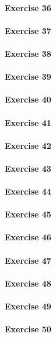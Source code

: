 \paragraph{Exercise 36}
\paragraph{Exercise 37}
\paragraph{Exercise 38}
\paragraph{Exercise 39}
\paragraph{Exercise 40}
\paragraph{Exercise 41}
\paragraph{Exercise 42}
\paragraph{Exercise 43}
\paragraph{Exercise 44}
\paragraph{Exercise 45}
\paragraph{Exercise 46}
\paragraph{Exercise 47}
\paragraph{Exercise 48}
\paragraph{Exercise 49}
\paragraph{Exercise 50}
